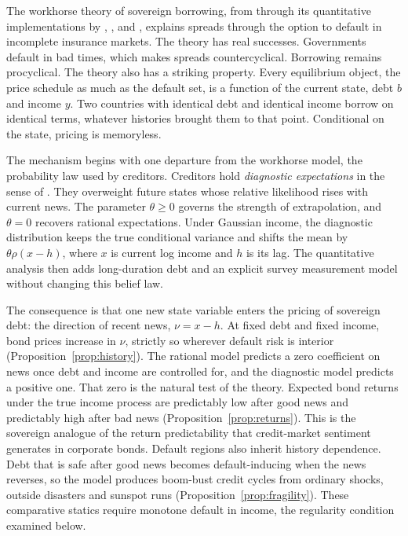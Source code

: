 \documentclass[11pt]{article}
\theoremstyle{definition}
\begin{document}
The workhorse theory of sovereign borrowing, from \citet{EatonGersovitz1981} through its quantitative implementations by \citet{AguiarGopinath2006}, \citet{Arellano2008}, and \citet{ChatterjeeEyigungor2012}, explains spreads through the option to default in incomplete insurance markets. The theory has real successes. Governments default in bad times, which makes spreads countercyclical. Borrowing remains procyclical. The theory also has a striking property. Every equilibrium object, the price schedule as much as the default set, is a function of the current state, debt $b$ and income $y$. Two countries with identical debt and identical income borrow on identical terms, whatever histories brought them to that point. Conditional on the state, pricing is memoryless.

The mechanism begins with one departure from the workhorse model, the probability law used by creditors. Creditors hold \emph{diagnostic expectations} in the sense of \citet{BordaloGennaioliShleifer2018}. They overweight future states whose relative likelihood rises with current news. The parameter $\theta \geq 0$ governs the strength of extrapolation, and $\theta = 0$ recovers rational expectations. Under Gaussian income, the diagnostic distribution keeps the true conditional variance and shifts the mean by $\theta \rho(x-h)$, where $x$ is current log income and $h$ is its lag. The quantitative analysis then adds long-duration debt and an explicit survey measurement model without changing this belief law.

The consequence is that one new state variable enters the pricing of sovereign debt: the direction of recent news, $\nu = x - h$. At fixed debt and fixed income, bond prices increase in $\nu$, strictly so wherever default risk is interior (Proposition~\ref{prop:history}). The rational model predicts a zero coefficient on news once debt and income are controlled for, and the diagnostic model predicts a positive one. That zero is the natural test of the theory. Expected bond returns under the true income process are predictably low after good news and predictably high after bad news (Proposition~\ref{prop:returns}). This is the sovereign analogue of the return predictability that credit-market sentiment generates in corporate bonds. Default regions also inherit history dependence. Debt that is safe after good news becomes default-inducing when the news reverses, so the model produces boom-bust credit cycles from ordinary shocks, outside disasters and sunspot runs (Proposition~\ref{prop:fragility}). These comparative statics require monotone default in income, the regularity condition examined below.
\end{document}
